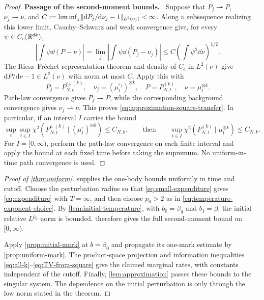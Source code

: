 \documentclass[11pt,reqno]{amsart}
\numberwithin{equation}{section}
\theoremstyle{plain}
\theoremstyle{remark}
\DeclarePairedDelimiter{\norm}{\lVert}{\rVert}
\renewcommand{\d}{\mathsf{d}}\newcommand{\s}{\mathsf{s}}
\newcommand{\parheading}[1]{\par\medskip\noindent\textbf{#1}\ }
\begin{document}
\begin{proof}
\parheading{Passage of the second-moment bounds.}
Suppose that $P_j\rightharpoonup P$, $\nu_j\rightharpoonup\nu$, and
$C:=\liminf_j\norm{\mathrm dP_j/\mathrm d\nu_j-1}_{L^2(\nu_j)}<\infty$.
Along a subsequence realizing this lower limit, Cauchy--Schwarz and weak convergence give, for every $\psi\in C_c(\R^{\d k})$,
\begin{equation}\label{eq:L2-lower-semicontinuity}
 \left|\int\psi\dd(P-\nu)\right|
 =\lim_j\left|\int\psi\dd(P_j-\nu_j)\right|
 \le C\left(\int\psi^2\dd\nu\right)^{1/2}.
\end{equation}
The Riesz--Fr\'echet representation theorem and density of $C_c$ in $L^2(\nu)$ give $\mathrm dP/\mathrm d\nu-1\in L^2(\nu)$ with norm at most $C$. Apply this with
\begin{equation}\label{eq:approximation-terminal-measures}
 P_j=P_{N,t}^{\varepsilon_j,(k)},\quad
 \nu_j=(\mu_t^{\varepsilon_j})^{\otimes k},\quad
 P=P_{N,t}^{(k)},\quad \nu=\mu_t^{\otimes k}.
\end{equation}
Path-law convergence gives $P_j\rightharpoonup P$, while the corresponding background convergence gives $\nu_j\rightharpoonup\nu$. This proves \eqref{eq:approximation-square-transfer}. In particular, if an interval $I$ carries the bound
\begin{equation}\label{eq:approximation-uniform-time-transfer}
 \sup_{\varepsilon}\sup_{t\in I}
 \chi^2(P_{N,t}^{\varepsilon,(k)}\mid(\mu_t^\varepsilon)^{\otimes k})\le C_{N,k},
 \qquad\text{then}\qquad
 \sup_{t\in I}\chi^2(P_{N,t}^{(k)}\mid\mu_t^{\otimes k})\le C_{N,k}.
\end{equation}
For $I=[0,\infty)$, perform the path-law convergence on each finite interval and apply the bound at each fixed time before taking the supremum. No uniform-in-time path convergence is used.
\end{proof}

\begin{proof}[Proof of \cref{thm:uniform}]
 supplies the one-body bounds uniformly in time and cutoff. Choose the perturbation radius so that \eqref{eq:small-expenditure} gives \eqref{eq:expenditure} with $T=\infty$, and then choose $p_0>2$ as in \eqref{eq:temperature-exponent-choice}. By \cref{lem:initial-temperature}, with $b_0=\beta_0$ and $b_1=\beta$, the initial relative $L^{p_0}$ norm is bounded.  therefore gives the full second-moment bound on $[0,\infty)$.

Apply \cref{prop:initial-mark} at $b=\beta_0$ and propagate its one-mark estimate by \cref{prop:uniform-mark}. The product-space projection and information inequalities \eqref{eq:all-k}--\eqref{eq:TV-from-square} give the claimed marginal rates, with constants independent of the cutoff. Finally, \cref{lem:approximation} passes these bounds to the singular system. The dependence on the initial perturbation is only through the low norm stated in the theorem.
\end{proof}
\end{document}
